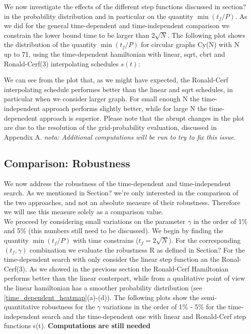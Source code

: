         

        We now investigate the effects of the different step functions discussed in section? in the probability distribution and in particular on the quantity $\min(t_f/P)$. As we did for the general time-dependent and time-independent comparison we constrain the lower bound time to be larger than $2\sqrt{N}$.
        The following plot shows the distribution of the quantity $\min(t_f/P)$ for circular graphs Cy(N) with N up to 71, using the time-dependent hamiltonian with linear, sqrt, cbrt and Ronald-Cerf(3) interpolating schedules $s(t)$:

        

        \noindent
        We can see from the plot that, as we might have expected, the Ronald-Cerf interpolating schedule performes better than the linear and sqrt schedules, in particular when we consider larger graph. For small enough N the time-independent approach performs slightly better, while for large N the time-depenedent approach is superior. Please note that the abrupt changes in the plot are due to the resolution of the grid-probability evaluation, discussed in Appendix A. \textit{nota: Additional computations will be run to try to fix this issue}.


    \subsection{Comparison: Robustness}
    We now address the robustness of the time-dependent and time-independent search. As we mentioned in Section? we're only interested in the comparison of the two approaches, and not an absolute measure of their robustness. Therefore we will use this measure solely as a comparison value. \\
    We proceed by considering small variations on the parameter $\gamma$ in the order of 1\% and 5\% (this numbers still need to be discussed). We begin by finding the quantity $\min(t_f/P)$ with time constrains ($t_f = 2\sqrt{N}$). For the corresponding $(t_f,\gamma)$ combination we evaluate the robustness R as defined in Section?
    For the time-dependent search with only consider the linear step function an the Ronal-Cerf(3). As we showed in the previous section the Ronald-Cerf Hamiltonian performs better than the linear conterpart, while from a qualitative point of view the linear hamiltonian has a smoother probability distribution (see \cref{time_dependent_heatmap}(a)-(d)). The following plots show the semi-quantitative robustness for the $\gamma$ variations in the order of 1\% - 5\% for the time-independent search and the time-dependent one with linear and Ronald-Cerf step functions s(t). \textbf{Computations are still needed}

